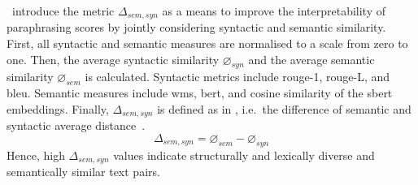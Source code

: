 \citet{gohsen_captions_2023}\ introduce the metric $\Delta_{sem,syn}$ as a means to improve the interpretability of paraphrasing scores by jointly considering syntactic and semantic similarity.
First, all syntactic and semantic measures are normalised to a scale from zero to one.
Then, the average syntactic similarity $\diameter_{syn}$ and the average semantic similarity $\diameter_{sem}$ is calculated.
Syntactic metrics include \ac{rouge}-1, \ac{rouge}-L, and \ac{bleu}.
Semantic measures include \ac{wms}, \ac{bert}, and cosine similarity of the \ac{sbert} embeddings.
Finally, $\Delta_{sem,syn}$ is defined as in , i.e.\ the difference of semantic and syntactic average distance~\citep{gohsen_captions_2023}.
\begin{equation}
    \Delta_{sem,syn}=\diameter_{sem}-\diameter_{syn}
    \label{eq:gohsen_delta}
\end{equation}
Hence, high $\Delta_{sem,syn}$ values indicate structurally and lexically diverse and semantically similar text pairs.
